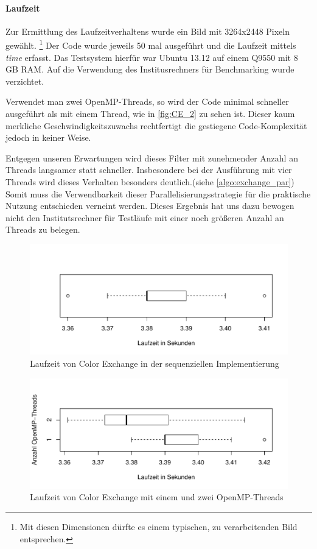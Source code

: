 \documentclass[10pt,a4paper]{article}
\begin{document}
\paragraph{Laufzeit}
Zur Ermittlung des Laufzeitverhaltens wurde ein Bild mit 3264x2448 Pixeln gewählt. \footnote{Mit diesen Dimensionen dürfte es einem typischen, zu verarbeitenden Bild entsprechen.} Der Code wurde jeweils 50 mal ausgeführt und die Laufzeit mittels \textit{time} erfasst. Das Testsystem hierfür war Ubuntu 13.12 auf einem Q9550 mit 8 GB RAM. Auf die Verwendung des Institusrechners für Benchmarking wurde verzichtet.

Verwendet man zwei OpenMP-Threads, so wird der Code minimal schneller ausgeführt als mit einem Thread, wie in \autoref{fig:CE_2} zu sehen ist. Dieser kaum merkliche Geschwindigkeitszuwachs rechtfertigt die gestiegene Code-Komplexität jedoch in keiner Weise.

Entgegen unseren Erwartungen wird dieses Filter mit zunehmender Anzahl an Threads langsamer statt schneller. Insbesondere bei der Ausführung mit vier Threads wird dieses Verhalten besonders deutlich.(siehe \autoref{algo:exchange_par}) Somit muss die Verwendbarkeit dieser Parallelisierungsstrategie für die praktische Nutzung entschieden verneint werden. Dieses Ergebnis hat uns dazu bewogen nicht den Institutsrechner für Testläufe mit einer noch größeren Anzahl an Threads zu belegen.
\begin{figure}[H]
\centering
\includegraphics[scale=0.7]{graphs/seq.pdf}
\caption{Laufzeit von Color Exchange in der sequenziellen Implementierung}
\label{fig:CE_seq}
\end{figure}
\begin{figure}[H]
\centering
\includegraphics[scale=0.7]{graphs/diag_2threads.pdf}
\caption{Laufzeit von Color Exchange mit einem und zwei OpenMP-Threads}
\label{fig:CE_2}
\end{figure}
\end{document}
